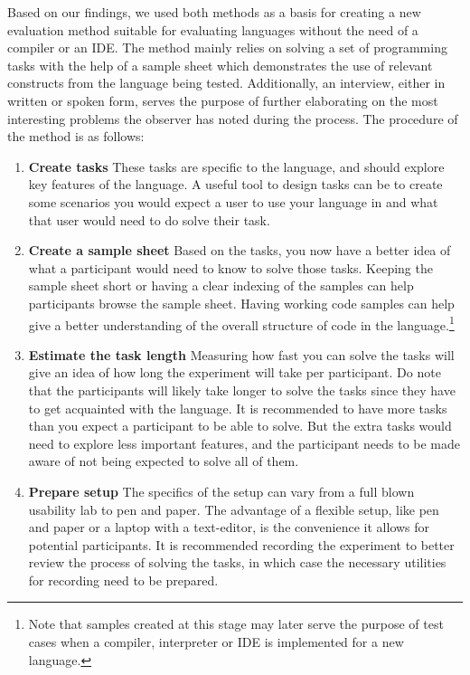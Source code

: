 \documentclass[preprint,10pt]{sigplanconf}
\begin{document}
Based on our findings, we used both methods as a basis for creating a new evaluation method suitable for evaluating languages without the need of a compiler or an IDE. The method mainly relies on solving a set of programming tasks with the help of a sample sheet which demonstrates the use of relevant constructs from the language being tested. Additionally, an interview, either in written or spoken form, serves the purpose of further elaborating on the most interesting problems the observer has noted during the process. The procedure of the method is as follows:

\begin{enumerate}
\item \textbf{Create tasks} These tasks are specific to the language, and should explore key features of the language. A useful tool to design tasks can be to create some scenarios you would expect a user to use your language in and what that user would need to do solve their task.
\item \textbf{Create a sample sheet} Based on the tasks, you now have a better idea of what a participant would need to know to solve those tasks. Keeping the sample sheet short or having a clear indexing of the samples can help participants browse the sample sheet. Having working code samples can help give a better understanding of the overall structure of code in the language.\footnote{Note that samples created at this stage may later serve the purpose of test cases when a compiler, interpreter or IDE is implemented for a new language.}
\item \textbf{Estimate the task length} Measuring how fast you can solve the tasks will give an idea of how long the experiment will take per participant. Do note that the participants will likely take longer to solve the tasks since they have to get acquainted with the language. It is recommended to have more tasks than you expect a participant to be able to solve. But the extra tasks would need to explore less important features, and the participant needs to be made aware of not being expected to solve all of them.
\item \textbf{Prepare setup} The specifics of the setup can vary from a full blown usability lab to pen and paper. The advantage of a flexible setup, like pen and paper or a laptop with a text-editor, is the convenience it allows for potential participants. It is recommended recording the experiment to better review the process of solving the tasks, in which case the necessary utilities for recording need to be prepared.

\end{enumerate}
\end{document}
